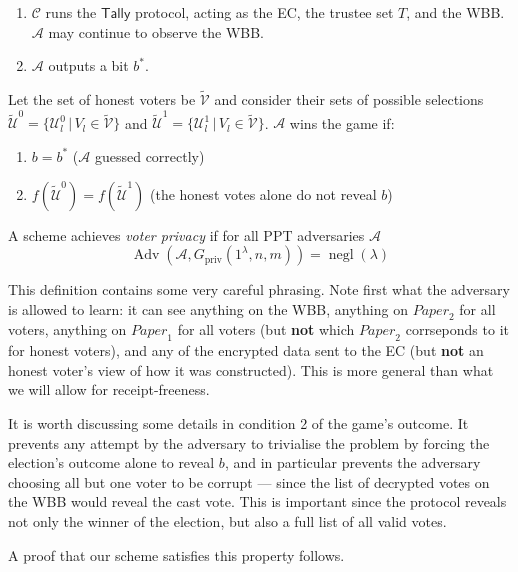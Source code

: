 \documentclass[11pt,twoside,a4paper]{article}
\DeclareMathOperator{\negl}{\text{negl}}
\DeclareMathOperator{\Adv}{\text{Adv}}
\theoremstyle{definition}
\newcommand{\Paper}{\mathit{Paper}}
\begin{document}
\begin{definition}
\begin{enumerate}
\begin{itemize}
        \end{itemize}
        \item $\mathcal{C}$ runs the $\mathsf{Tally}$ protocol, acting as the EC, the trustee set $T$, and the WBB. $\mathcal{A}$ may continue to observe the WBB.
        \item $\mathcal{A}$ outputs a bit $b^*$.
    \end{enumerate}
    Let the set of honest voters be $\tilde{\mathcal{V}}$ and consider their sets of possible selections $\tilde{\mathcal{U}}^0=\{\mathcal{U}_l^0\,\vert\,V_l\in\tilde{\mathcal{V}}\}$ and $\tilde{\mathcal{U}}^1=\{\mathcal{U}_l^1\,\vert\,V_l\in\tilde{\mathcal{V}}\}$. $\mathcal{A}$ wins the game if:
    \begin{enumerate}
        \item $b=b^*$ ($\mathcal{A}$ guessed correctly)
        \item $f\left(\tilde{\mathcal{U}}^0\right) = f\left(\tilde{\mathcal{U}}^1\right)$ (the honest votes alone do not reveal $b$)
    \end{enumerate}
    A scheme achieves \textit{voter privacy} if for all PPT adversaries $\mathcal{A}$
    $$\Adv\left(\mathcal{A}, G_{\text{priv}}(1^\lambda, n, m)\right)=\negl(\lambda)$$
\end{definition}
This definition contains some very careful phrasing. Note first what the adversary is allowed to learn: it can see anything on the WBB, anything on $\Paper_2$ for all voters, anything on $\Paper_1$ for all voters (but \textbf{not} which $\Paper_2$ corrseponds to it for honest voters), and any of the encrypted data sent to the EC (but \textbf{not} an honest voter's view of how it was constructed). This is more general than what we will allow for receipt-freeness.

It is worth discussing some details in condition 2 of the game's outcome. It prevents any attempt by the adversary to trivialise the problem by forcing the election's outcome alone to reveal $b$, and in particular prevents the adversary choosing all but one voter to be corrupt --- since the list of decrypted votes on the WBB would reveal the cast vote. This is important since the protocol reveals not only the winner of the election, but also a full list of all valid votes.

A proof that our scheme satisfies this property follows.
\end{document}
